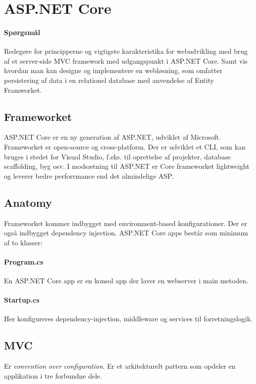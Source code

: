 \section{ASP.NET Core}

\paragraph{Spørgsmål}
Redegøre for principperne og vigtigste karakteristika for webudvikling med brug af et server-side MVC framework med udgangspunkt i ASP.NET Core. Samt vis hvordan man kan designe og implementere en	webløsning, som omfatter persistering af data i en relationel database med anvendelse af Entity Framworket.

\subsection{Frameworket}
ASP.NET Core er en ny generation af ASP.NET, udviklet af Microsoft. Frameworket er open-source og cross-platform.
Der er udviklet et CLI, som kan bruges i stedet for Visual Studio, f.eks. til oprettelse af projekter, database scaffolding, byg osv.
I modsætning til ASP.NET er Core frameworket lightweight og leverer bedre perforrmance end det almindelige ASP.

\subsection{Anatomy}
Frameworket kommer indbygget med environment-based konfigurationer. Der er også indbygget dependency injection. ASP.NET Core apps består som minimum af to klasser:

\paragraph{Program.cs}
En ASP.NET Core app er en konsol app der laver en webserver i main metoden.

\paragraph{Startup.cs}
Her konfigureres dependency-injection, middleware og services til forretningslogik.

\subsection{MVC}
Er \textit{convention over configuration}. Er et arkitekturelt pattern som opdeler en applikation i tre forbundne dele.

